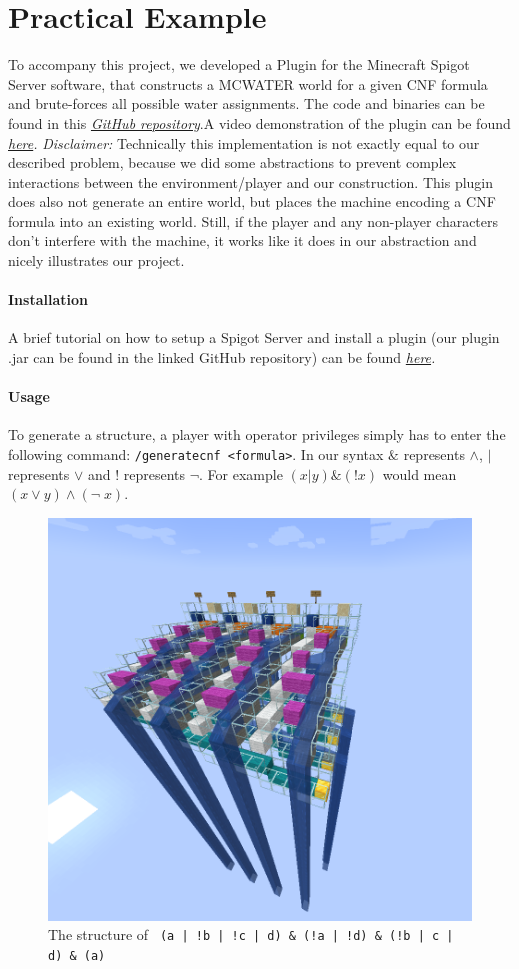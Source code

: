 \section{Practical Example}


To accompany this project, we developed a Plugin for the Minecraft Spigot Server software, that constructs a MCWATER world for a given CNF formula and brute-forces all possible water assignments. The code and binaries can be found in this \textit{\href{https://github.com/JonathanDotExe/minecraft-water-problem}{GitHub repository}}.\newline A video demonstration of the plugin can be found \textit{\href{https://youtube.com}{here}.}
\newline
\newline \emph{Disclaimer: } Technically this implementation is not exactly equal to our described problem, because we did some abstractions to prevent complex interactions between the environment/player and our construction. This plugin does also not generate an entire world, but places the machine encoding a CNF formula into an existing world. Still, if the player and any non-player characters don't interfere with the machine, it works like it does in our abstraction and nicely illustrates our project.

\paragraph{Installation}
A brief tutorial on how to setup a Spigot Server and install a plugin (our plugin .jar can be found in the linked GitHub repository) can be found \textit{\href{https://www.spigotmc.org/wiki/spigot-installation/}{here}.}

\paragraph{Usage}
To generate a structure, a player with operator privileges simply has to enter the following command: \verb|/generatecnf <formula>|. In our syntax $\&$ represents $\wedge$, $\vert$ represents $\vee$ and ! represents $\neg$. For example $(x | y) \& (!x)$ would mean $(x \vee y) \wedge (\neg \; x)$.

\begin{figure}[h]
    \centering
    \includegraphics[width=.5\linewidth]{images/big_example.png}
    \cprotect\caption{The structure of \verb+ (a | !b | !c | d) & (!a | !d) & (!b | c | d) & (a)+}
    \label{fig:small-example2}
\end{figure}

